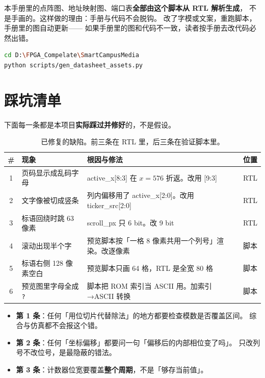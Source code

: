 \documentclass[10pt,a4paper]{article}
\newcommand{\code}[1]{{\ttfamily\small #1}}
\begin{document}
本手册里的点阵图、地址映射图、端口表\textbf{全部由这个脚本从 RTL 解析生成}，
不是手画的。这样做的理由：手册与代码不会脱钩。
改了字模或文案，重跑脚本，手册里的图自动更新——
如果手册里的图和代码不一致，读者按手册去改代码必然出错。

\begin{lstlisting}[language=bash,caption={重新生成手册资产},label={lst:assets}]
cd D:\FPGA_Compelate\SmartCampusMedia
python scripts/gen_datasheet_assets.py
\end{lstlisting}

\section{踩坑清单}
\label{sec:pitfall}

下面每一条都是本项目\textbf{实际踩过并修好}的，不是假设。

\begin{table}[htbp]
\centering\small
\caption{已修复的缺陷。前三条在 RTL 里，后三条在验证脚本里。}
\label{tab:pitfalls}
\renewcommand{\arraystretch}{1.3}
\begin{tabularx}{\linewidth}{@{}c l X l@{}}
\toprule
\textbf{\#} & \textbf{现象} & \textbf{根因与修法} & \textbf{位置}\\
\midrule
1 & 页码显示成乱码字母 & \code{active\_x[8:3]} 在 $x=576$ 折返。改用 \code{[9:3]} & RTL\\
2 & 文字像被切成竖条 & 列内偏移用了 \code{active\_x[2:0]}。改用 \code{ticker\_src[2:0]} & RTL\\
3 & 标语回绕时跳 63 像素 & \code{scroll\_px} 只 6 bit。改 9 bit & RTL\\
\midrule
4 & 滚动出现半个字 & 预览脚本按「一格 8 像素共用一个列号」渲染。改逐像素 & 脚本\\
5 & 标语右侧 128 像素空白 & 预览脚本只画 64 格，RTL 是全宽 80 格 & 脚本\\
6 & 预览图里字母全成 \texttt{?} & 脚本把 ROM 索引当 ASCII 用。加索引→ASCII 转换 & 脚本\\
\bottomrule
\end{tabularx}
\end{table}

\begin{dswarn}[三条最容易复发的]
\begin{itemize}
\item \textbf{第 1 条}：任何「用位切片代替除法」的地方都要检查模数是否覆盖区间。
      综合与仿真都不会报这个错。
\item \textbf{第 2 条}：任何「坐标偏移」都要问一句「偏移后的内部相位变了吗」。
      只改列号不改位号，是最隐蔽的错法。
\item \textbf{第 3 条}：计数器位宽要覆盖\textbf{整个周期}，不是「够存当前值」。
\end{itemize}
\end{dswarn}
\end{document}
